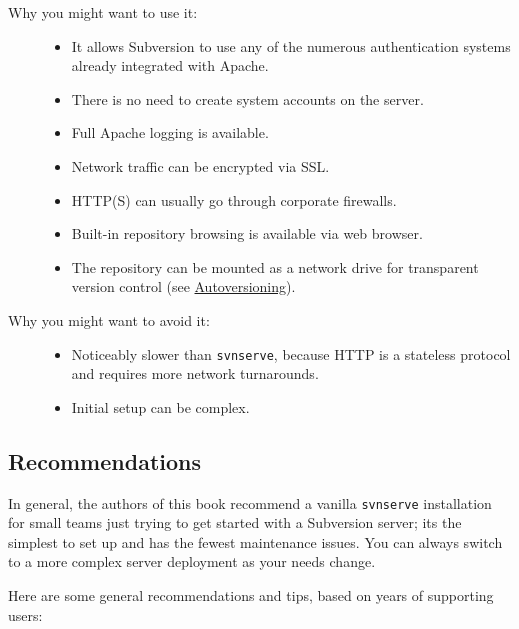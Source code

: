 \begin{description}
\item[Why you might want to use it:]
\hfill
\begin{itemize}
\item
  It allows Subversion to use any of the numerous authentication systems
  already integrated with Apache.
\item
  There is no need to create system accounts on the server.
\item
  Full Apache logging is available.
\item
  Network traffic can be encrypted via SSL.
\item
  HTTP(S) can usually go through corporate firewalls.
\item
  Built-in repository browsing is available via web browser.
\item
  The repository can be mounted as a network drive for transparent
  version control (see
  \hyperref[svn.webdav.autoversioning]{Autoversioning}).
\end{itemize}
\item[Why you might want to avoid it:]
\hfill
\begin{itemize}
\item
  Noticeably slower than \texttt{svnserve}, because HTTP is a stateless
  protocol and requires more network turnarounds.
\item
  Initial setup can be complex.
\end{itemize}
\end{description}

\subsection{Recommendations}\label{svn.serverconfig.choosing.recommendations}

In general, the authors of this book recommend a vanilla
\texttt{svnserve} installation for small teams just trying to get
started with a Subversion server; it\textquotesingle s the simplest to
set up and has the fewest maintenance issues. You can always switch to a
more complex server deployment as your needs change.

Here are some general recommendations and tips, based on years of
supporting users:

